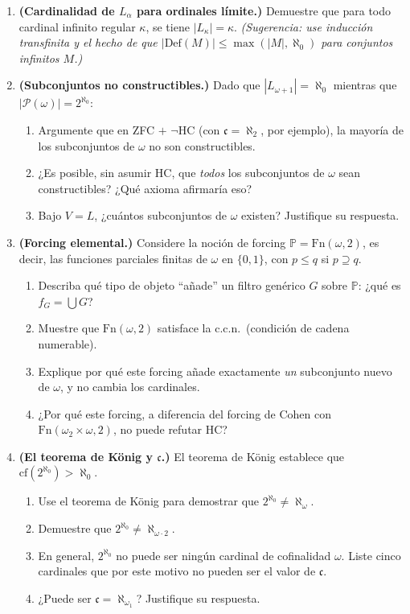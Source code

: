 \begin{enumerate}[leftmargin=2em, label=\textbf{P\arabic*.}]
  \item \textbf{(Cardinalidad de $L_\alpha$ para ordinales límite.)} Demuestre que para todo cardinal infinito regular $\kappa$, se tiene $|L_\kappa| = \kappa$. \textit{(Sugerencia: use inducción transfinita y el hecho de que $|\mathrm{Def}(M)| \leq \max(|M|, \aleph_0)$ para conjuntos infinitos $M$.)}

  \item \textbf{(Subconjuntos no constructibles.)} Dado que $|L_{\omega+1}| = \aleph_0$ mientras que $|\mathcal{P}(\omega)| = 2^{\aleph_0}$:
  \begin{enumerate}[label=(\alph*)]
    \item Argumente que en ZFC $+$ $\neg$HC (con $\mathfrak{c} = \aleph_2$, por ejemplo), la mayoría de los subconjuntos de $\omega$ no son constructibles.
    \item ¿Es posible, sin asumir HC, que \emph{todos} los subconjuntos de $\omega$ sean constructibles? ¿Qué axioma afirmaría eso?
    \item Bajo $V = L$, ¿cuántos subconjuntos de $\omega$ existen? Justifique su respuesta.
  \end{enumerate}

  \item \textbf{(Forcing elemental.)} Considere la noción de forcing $\mathbb{P} = \mathrm{Fn}(\omega, 2)$, es decir, las funciones parciales finitas de $\omega$ en $\{0,1\}$, con $p \leq q$ si $p \supseteq q$.
  \begin{enumerate}[label=(\alph*)]
    \item Describa qué tipo de objeto ``añade'' un filtro genérico $G$ sobre $\mathbb{P}$: ¿qué es $f_G = \bigcup G$?
    \item Muestre que $\mathrm{Fn}(\omega, 2)$ satisface la c.c.n.\ (condición de cadena numerable).
    \item Explique por qué este forcing añade exactamente \emph{un} subconjunto nuevo de $\omega$, y no cambia los cardinales.
    \item ¿Por qué este forcing, a diferencia del forcing de Cohen con $\mathrm{Fn}(\omega_2 \times \omega, 2)$, no puede refutar HC?
  \end{enumerate}

  \item \textbf{(El teorema de König y $\mathfrak{c}$.)} El teorema de König establece que $\mathrm{cf}(2^{\aleph_0}) > \aleph_0$.
  \begin{enumerate}[label=(\alph*)]
    \item Use el teorema de König para demostrar que $2^{\aleph_0} \neq \aleph_\omega$.
    \item Demuestre que $2^{\aleph_0} \neq \aleph_{\omega \cdot 2}$.
    \item En general, $2^{\aleph_0}$ no puede ser ningún cardinal de cofinalidad $\omega$. Liste cinco cardinales que por este motivo no pueden ser el valor de $\mathfrak{c}$.
    \item ¿Puede ser $\mathfrak{c} = \aleph_{\omega_1}$? Justifique su respuesta.
  \end{enumerate}


\end{enumerate}
